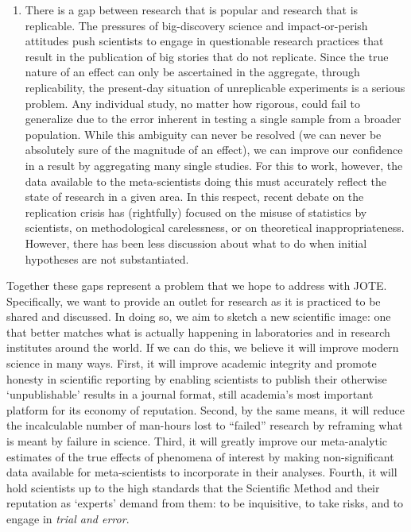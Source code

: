 \documentclass[twocolumn, serif]{jote-article}
\begin{document}
{\begin{enumerate}
  In line with the self-image of science as suppressing errors and   overemphasizing productive big discoveries, this impact-or-perish   mindset reinforces the idea that the role of the scientist is to   succeed, not to inquire.
\item   There is a gap between research that is popular and research that is   replicable. The pressures of big-discovery science and   impact-or-perish attitudes push scientists to engage in questionable   research practices that result in the publication of big stories that   do not replicate. Since the true nature of an effect can only be   ascertained in the aggregate, through replicability, the present-day   situation of unreplicable experiments is a serious problem. Any   individual study, no matter how rigorous, could fail to generalize due   to the error inherent in testing a single sample from a broader   population. While this ambiguity can never be resolved (we can never   be absolutely sure of the magnitude of an effect), we can improve our   confidence in a result by aggregating many single studies. For this to   work, however, the data available to the meta-scientists doing this   must accurately reflect the state of research in a given area. In this   respect, recent debate on the replication crisis has (rightfully)   focused on the misuse of statistics by scientists, on methodological   carelessness, or on theoretical inappropriateness. However, there has   been less discussion about what to do when initial hypotheses are not   substantiated.
\end{enumerate}

Together these gaps represent a problem that we hope to address with JOTE. Specifically, we want to provide an outlet for research as it is practiced to be shared and discussed. In doing so, we aim to sketch a new scientific image: one that better matches what is actually happening in laboratories and in research institutes around the world. If we can do this, we believe it will improve modern science in many ways. First, it will improve academic integrity and promote honesty in scientific reporting by enabling scientists to publish their otherwise `unpublishable' results in a journal format, still academia's most important platform for its economy of reputation. Second, by the same means, it will reduce the incalculable number of man-hours lost to ``failed'' research by reframing what is meant by failure in science.
Third, it will greatly improve our meta-analytic estimates of the true effects of phenomena of interest by making non-significant data available for meta-scientists to incorporate in their analyses. Fourth, it will hold scientists up to the high standards that the Scientific Method and their reputation as `experts' demand from them: to be inquisitive, to take risks, and to engage in \emph{trial and error}.

}
\end{document}
